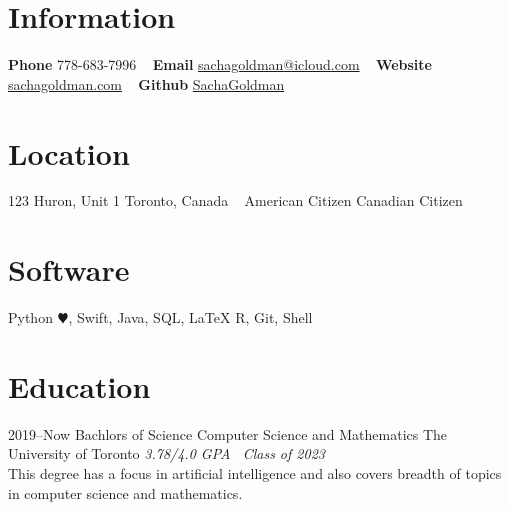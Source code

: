 \documentclass[]{style}
\begin{document}


\begin{aside} %
\section{Information}
\textbf{Phone}
778-683-7996
~ \vspace{-2mm}
\textbf{Email}
\href{mailto:sachagoldman@icloud.com}{sachagoldman@icloud.com} 
~ \vspace{-2mm}
\textbf{Website} 
\href{https://sachagoldman.com}{sachagoldman.com} 
~ \vspace{-2mm}
\textbf{Github}
\href{https://github.com/SachaGoldman}{SachaGoldman}
\section{Location}
123 Huron, Unit 1
Toronto, Canada 
~ \vspace{-2mm}
American Citizen
Canadian Citizen
\section{Software}
Python {\color{red} $\varheartsuit$}, Swift,
Java, SQL, LaTeX
R, Git, Shell
\end{aside}


\section{Education}

\begin{entrylist}


\entry
{2019–Now}
{Bachlors of Science {\normalfont Computer Science and Mathematics}}
{The University of Toronto}
{\emph{3.78/4.0 GPA \ Class of 2023} \\ This degree has a focus in artificial intelligence and also covers breadth of topics in computer science and mathematics.}


\end{entrylist}
\end{document}
